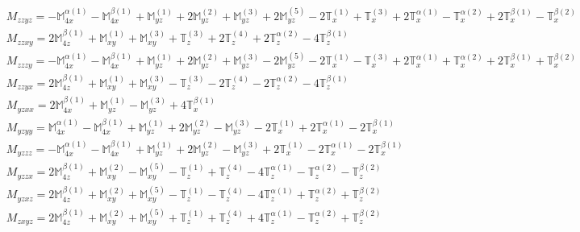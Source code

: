 \documentclass[fleqn,8pt,landscape]{jsarticle}
\begin{document}
\begin{align*}
& M_{zzyz} = - \mathbb{M}_{4x}^{\alpha(1)} - \mathbb{M}_{4x}^{\beta(1)} + \mathbb{M}_{yz}^{(1)} + 2 \mathbb{M}_{yz}^{(2)} + \mathbb{M}_{yz}^{(3)} + 2 \mathbb{M}_{yz}^{(5)} - 2 \mathbb{T}_{x}^{(1)} + \mathbb{T}_{x}^{(3)} + 2 \mathbb{T}_{x}^{\alpha(1)} - \mathbb{T}_{x}^{\alpha(2)} + 2 \mathbb{T}_{x}^{\beta(1)} - \mathbb{T}_{x}^{\beta(2)} \\
& M_{zzxy} = 2 \mathbb{M}_{4z}^{\beta(1)} + \mathbb{M}_{xy}^{(1)} + \mathbb{M}_{xy}^{(3)} + \mathbb{T}_{z}^{(3)} + 2 \mathbb{T}_{z}^{(4)} + 2 \mathbb{T}_{z}^{\alpha(2)} - 4 \mathbb{T}_{z}^{\beta(1)} \\
& M_{zzzy} = - \mathbb{M}_{4x}^{\alpha(1)} - \mathbb{M}_{4x}^{\beta(1)} + \mathbb{M}_{yz}^{(1)} + 2 \mathbb{M}_{yz}^{(2)} + \mathbb{M}_{yz}^{(3)} - 2 \mathbb{M}_{yz}^{(5)} - 2 \mathbb{T}_{x}^{(1)} - \mathbb{T}_{x}^{(3)} + 2 \mathbb{T}_{x}^{\alpha(1)} + \mathbb{T}_{x}^{\alpha(2)} + 2 \mathbb{T}_{x}^{\beta(1)} + \mathbb{T}_{x}^{\beta(2)} \\
& M_{zzyx} = 2 \mathbb{M}_{4z}^{\beta(1)} + \mathbb{M}_{xy}^{(1)} + \mathbb{M}_{xy}^{(3)} - \mathbb{T}_{z}^{(3)} - 2 \mathbb{T}_{z}^{(4)} - 2 \mathbb{T}_{z}^{\alpha(2)} - 4 \mathbb{T}_{z}^{\beta(1)} \\
& M_{yzxx} = 2 \mathbb{M}_{4x}^{\beta(1)} + \mathbb{M}_{yz}^{(1)} - \mathbb{M}_{yz}^{(3)} + 4 \mathbb{T}_{x}^{\beta(1)} \\
& M_{yzyy} = \mathbb{M}_{4x}^{\alpha(1)} - \mathbb{M}_{4x}^{\beta(1)} + \mathbb{M}_{yz}^{(1)} + 2 \mathbb{M}_{yz}^{(2)} - \mathbb{M}_{yz}^{(3)} - 2 \mathbb{T}_{x}^{(1)} + 2 \mathbb{T}_{x}^{\alpha(1)} - 2 \mathbb{T}_{x}^{\beta(1)} \\
& M_{yzzz} = - \mathbb{M}_{4x}^{\alpha(1)} - \mathbb{M}_{4x}^{\beta(1)} + \mathbb{M}_{yz}^{(1)} + 2 \mathbb{M}_{yz}^{(2)} - \mathbb{M}_{yz}^{(3)} + 2 \mathbb{T}_{x}^{(1)} - 2 \mathbb{T}_{x}^{\alpha(1)} - 2 \mathbb{T}_{x}^{\beta(1)} \\
& M_{yzzx} = 2 \mathbb{M}_{4z}^{\beta(1)} + \mathbb{M}_{xy}^{(2)} - \mathbb{M}_{xy}^{(5)} - \mathbb{T}_{z}^{(1)} + \mathbb{T}_{z}^{(4)} - 4 \mathbb{T}_{z}^{\alpha(1)} - \mathbb{T}_{z}^{\alpha(2)} - \mathbb{T}_{z}^{\beta(2)} \\
& M_{yzxz} = 2 \mathbb{M}_{4z}^{\beta(1)} + \mathbb{M}_{xy}^{(2)} + \mathbb{M}_{xy}^{(5)} - \mathbb{T}_{z}^{(1)} - \mathbb{T}_{z}^{(4)} - 4 \mathbb{T}_{z}^{\alpha(1)} + \mathbb{T}_{z}^{\alpha(2)} + \mathbb{T}_{z}^{\beta(2)} \\
& M_{zxyz} = 2 \mathbb{M}_{4z}^{\beta(1)} + \mathbb{M}_{xy}^{(2)} + \mathbb{M}_{xy}^{(5)} + \mathbb{T}_{z}^{(1)} + \mathbb{T}_{z}^{(4)} + 4 \mathbb{T}_{z}^{\alpha(1)} - \mathbb{T}_{z}^{\alpha(2)} + \mathbb{T}_{z}^{\beta(2)} \\

\end{align*}
\end{document}
